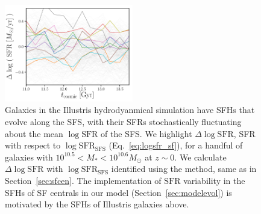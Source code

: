 \documentclass[12pt, letterpaper, preprint, tighten]{aastex62}
\newcommand{\logsfr}{\log\mathrm{SFR}}
\newcommand{\logsfrsfs}{\log\mathrm{SFR}_\mathrm{SFS}}
\begin{document}
\begin{figure}
\begin{center}
\includegraphics[width=0.5\textwidth]{figs/illustris_sfh.pdf}
    \caption{Galaxies in the Illustris hydrodyanmical simulation have SFHs that evolve 
    along the SFS, with their SFRs stochastically fluctuating about the mean $\logsfr$ 
    of the SFS. We highlight $\Delta \logsfr$, SFR with respect to $\logsfrsfs$ (Eq.~\ref{eq:logsfr_sf}),
    for a handful of galaxies with $10^{10.5}< M_* < 10^{10.6}M_\odot$ at $z\sim0$.
    We calculate $\Delta \logsfr$ with $\logsfrsfs$ identified using the \cite{hahn2018a}
    method, same as in Section~\ref{sec:sfcen}. The implementation of $\mathrm{SFR}$
    variability in the SFHs of SF centrals in our model (Section~\ref{sec:modelevol})
    is motivated by the SFHs of Illustris galaxies above.
    }
\label{fig:illsfh}
\end{center}
\end{figure}
\end{document}
